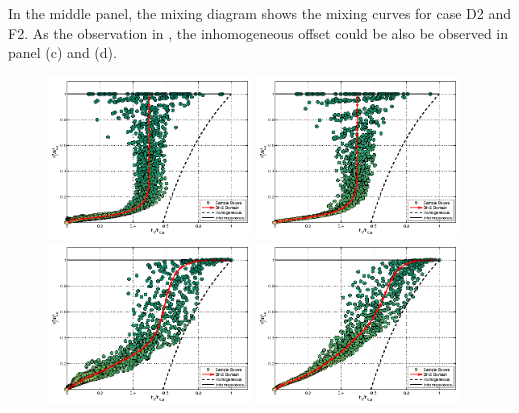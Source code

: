 \documentclass[draft,jgrga]{AGUTeX}
\begin{document}
\begin{article}
In the middle panel, the mixing diagram shows the mixing curves for case D2 and F2. As the observation in \cite{Kumar14}, the inhomogeneous offset could be also be observed in panel (c) and (d).
\begin{figure}\centering
\includegraphics[width=0.48\textwidth]{Figures/mixing_cased1}
\includegraphics[width=0.48\textwidth]{Figures/mixing_casef1}\\
\includegraphics[width=0.48\textwidth]{Figures/mixing_cased2}
\includegraphics[width=0.48\textwidth]{Figures/mixing_casef2}\\

\end{figure}
\end{article}
\end{document}
